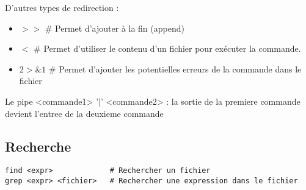 \documentclass{article}
\begin{document}
D'autres types de redirection :

\begin{itemize}
  \item $>>$  \# Permet d'ajouter à la fin (append)
  \item $<$ \# Permet d'utiliser le contenu d'un fichier pour exécuter la commande.
  \item $2>\&1$ \# Permet d'ajouter les potentielles erreurs de la commande dans le fichier
\end{itemize}

Le pipe <commande1> '|' <commande2> : la sortie de la premiere commande devient l'entree de la deuxieme commande

\subsection{Recherche}
\begin{lstlisting}
find <expr>             # Rechercher un fichier
grep <expr> <fichier>   # Rechercher une expression dans le fichier
\end{lstlisting}
\end{document}
